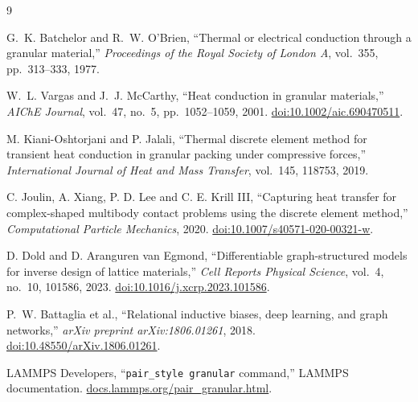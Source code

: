 \documentclass[12pt,a4paper]{article}
\begin{document}
\begin{thebibliography}{9}

G.~K. Batchelor and R.~W. O'Brien,
``Thermal or electrical conduction through a granular material,''
\emph{Proceedings of the Royal Society of London A}, vol.~355,
pp.~313--333, 1977.

W.~L. Vargas and J.~J. McCarthy,
``Heat conduction in granular materials,''
\emph{AIChE Journal}, vol.~47, no.~5, pp.~1052--1059, 2001.
\href{https://doi.org/10.1002/aic.690470511}
{doi:10.1002/aic.690470511}.

M. Kiani-Oshtorjani and P. Jalali,
``Thermal discrete element method for transient heat conduction in granular
packing under compressive forces,''
\emph{International Journal of Heat and Mass Transfer}, vol.~145,
118753, 2019.

C. Joulin, A. Xiang, P. D. Lee and C. E. Krill III,
``Capturing heat transfer for complex-shaped multibody contact problems using
the discrete element method,''
\emph{Computational Particle Mechanics}, 2020.
\href{https://doi.org/10.1007/s40571-020-00321-w}
{doi:10.1007/s40571-020-00321-w}.

D. Dold and D. Aranguren van Egmond,
``Differentiable graph-structured models for inverse design of lattice
materials,''
\emph{Cell Reports Physical Science}, vol.~4, no.~10, 101586, 2023.
\href{https://doi.org/10.1016/j.xcrp.2023.101586}
{doi:10.1016/j.xcrp.2023.101586}.

P.~W. Battaglia et al.,
``Relational inductive biases, deep learning, and graph networks,''
\emph{arXiv preprint arXiv:1806.01261}, 2018.
\href{https://doi.org/10.48550/arXiv.1806.01261}
{doi:10.48550/arXiv.1806.01261}.

LAMMPS Developers,
``\texttt{pair\_style granular} command,'' LAMMPS documentation.
\href{https://docs.lammps.org/pair_granular.html}
{docs.lammps.org/pair\_granular.html}.

\end{thebibliography}
\end{document}
